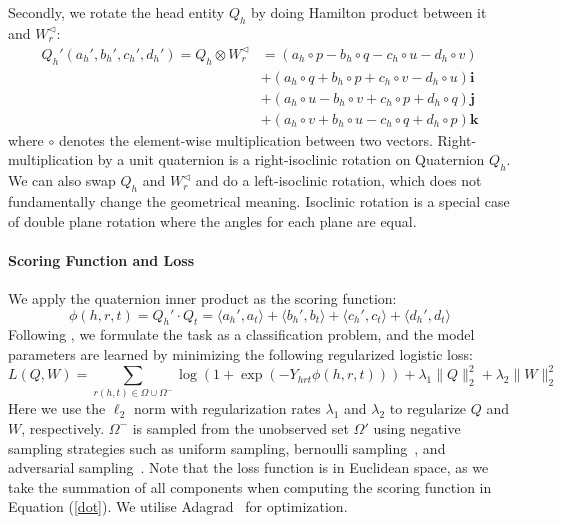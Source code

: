 \documentclass{article}
\begin{document}
Secondly, we rotate the head entity $Q_h$ by doing Hamilton product between it and $W_r^{\triangleleft}$:
\begin{equation}
\label{hamilton}
\begin{split}
    Q_h'(a_h', b_h', c_h', d_h') = Q_h \otimes W_r^{\triangleleft}   &=
   ( a_h \circ p - b_h\circ q - c_h\circ u - d_h\circ v )\\ &+ (a_h\circ q + b_h\circ p + c_h\circ v - d_h\circ u) \textbf{i} \\
   &+ (a_h\circ u - b_h\circ v + c_h\circ p + d_h\circ q) \textbf{j} \\ &+ (a_h\circ v + b_h\circ u - c_h\circ q + d_h\circ p) \textbf{k}
\end{split}
\end{equation}
where $\circ$ denotes the element-wise multiplication between two vectors. Right-multiplication by a unit quaternion is  a right-isoclinic rotation on Quaternion $Q_h$. We can also swap $Q_h$ and $W_r^{\triangleleft}$ and do a left-isoclinic rotation, which does not fundamentally change the geometrical meaning. Isoclinic rotation is a special case of double plane rotation where the angles for each plane are equal.






\paragraph{Scoring Function and Loss}
We apply the quaternion inner product as the scoring function:
\begin{equation}
    \phi(h, r, t) = Q_h' \cdot Q_t = \langle a_h', a_t\rangle + \langle b_h', b_t\rangle + \langle c_h', c_t\rangle + \langle d_h', d_t\rangle
    \label{dot}
\end{equation}
Following \citet{trouillon2016complex}, we formulate the task as a classification problem, and the model parameters are learned by minimizing the following regularized logistic loss:
\begin{equation}
    L(Q, W) = \sum_{r(h,t) \in \Omega \cup \Omega^- } \log(1 + \exp(-Y_{hrt}\phi(h,r,t))) + \lambda_1 \parallel Q \parallel_2^2  + \lambda_2 \parallel W \parallel_2^2
\end{equation}
Here we use the $\ell_2$ norm with regularization rates $\lambda_1$ and $\lambda_2$ to regularize $Q$ and $W$, respectively. $\Omega^-$ is sampled from the unobserved set $\Omega'$ using negative sampling strategies such as uniform sampling, bernoulli sampling~\citep{wang2014knowledge}, and adversarial sampling~\citep{sun2019rotate}. Note that the loss function is in Euclidean space, as we take the summation of all components when computing the scoring function in Equation (\ref{dot}). We utilise Adagrad~\citep{duchi2011adaptive} for optimization.
\end{document}
